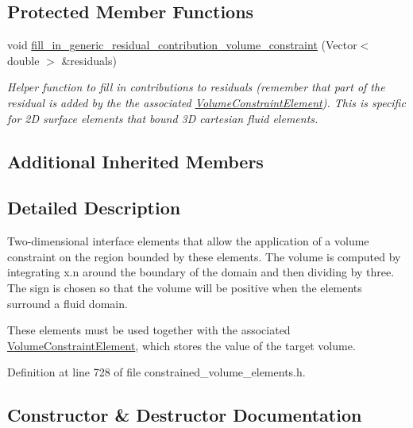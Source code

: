 \subsection*{Protected Member Functions}
\begin{DoxyCompactItemize}
\item 
void \hyperlink{classoomph_1_1SurfaceVolumeConstraintBoundingElement_a5813fa65063eb55a5b264539d77cac88}{fill\+\_\+in\+\_\+generic\+\_\+residual\+\_\+contribution\+\_\+volume\+\_\+constraint} (Vector$<$ double $>$ \&residuals)
\begin{DoxyCompactList}\small\item\em Helper function to fill in contributions to residuals (remember that part of the residual is added by the the associated \hyperlink{classoomph_1_1VolumeConstraintElement}{Volume\+Constraint\+Element}). This is specific for 2D surface elements that bound 3D cartesian fluid elements. \end{DoxyCompactList}\end{DoxyCompactItemize}
\subsection*{Additional Inherited Members}


\subsection{Detailed Description}
Two-\/dimensional interface elements that allow the application of a volume constraint on the region bounded by these elements. The volume is computed by integrating x.\+n around the boundary of the domain and then dividing by three. The sign is chosen so that the volume will be positive when the elements surround a fluid domain.

These elements must be used together with the associated \hyperlink{classoomph_1_1VolumeConstraintElement}{Volume\+Constraint\+Element}, which stores the value of the target volume. 

Definition at line 728 of file constrained\+\_\+volume\+\_\+elements.\+h.



\subsection{Constructor \& Destructor Documentation}
\mbox{\label{classoomph_1_1SurfaceVolumeConstraintBoundingElement_a1dc9bb792bbce8f69f063a33934fc84e}} 
